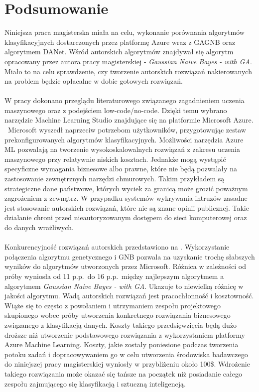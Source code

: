 \chapter{Podsumowanie}
Niniejsza praca magisterska miała na celu, wykonanie porównania algorytmów klasyfikacyjnych dostarczonych przez platformę Azure wraz z GAGNB oraz algorytmem DANet. Wśród autorskich algorytmów znajdywał się algorytm opracowany przez autora pracy magisterskiej - \textit{Gaussian Naive Bayes - with GA}. Miało to na celu sprawdzenie, czy tworzenie autorskich rozwiązań nakierowanych na problem będzie opłacalne w dobie gotowych rozwiązań.
\\ \\
W pracy dokonano przeglądu literaturowego związanego zagadnieniem uczenia maszynowego oraz z podejściem low-code/no-code. Dzięki temu wybrano narzędzie Machine Learning Studio znajdujące się na platformie Microsoft Azure. \ Microsoft wyszedł naprzeciw potrzebom użytkowników, przygotowując zestaw prekonfigurowanych algorytmów klasyfikacyjnych. Możliwości narzędzia Azure ML pozwalają na tworzenie wysokoskalowalnych rozwiązań z zakresu uczenia maszynowego przy relatywnie niskich kosztach. Jednakże mogą wystąpić specyficzne wymagania biznesowe albo prawne, które nie będą pozwalały na zastosowanie zewnętrznych narzędzi chmurowych. Takim przykładem są strategiczne dane państwowe, których wyciek za granicą może grozić poważnym zagrożeniem z zewnątrz. W przypadku systemów wykrywania intruzów zasadne jest stosowanie autorskich rozwiązań, które nie są znane opinii publicznej. Takie działanie chroni przed nieautoryzowanym dostępem do sieci komputerowej oraz do danych wrażliwych.
\\ \\
Konkurencyjność rozwiązań autorskich przedstawiono na . Wykorzystanie połączenia algorytmu genetycznego i GNB pozwala na uzyskanie trochę słabszych wyników do algorytmów utworzonych przez Microsoft. Różnica w zależności od próby wyniosła od 11 p.p.\ do 16 p.p.\ między najlepszym algorytmem a algorytmem \textit{Gaussian Naive Bayes - with GA}. Ukazuje to niewielką różnicę w jakości algorytmu. Wadą autorskich rozwiązań jest pracochłonność i kosztowność. Wiąże się to często z powołaniem i utrzymaniem zespołu projektowego skupionego wobec próby utworzenia konkretnego rozwiązania biznesowego związanego z klasyfikacją danych. Koszty takiego przedsięwzięcia będą dużo droższe niż utworzenie podstawowego rozwiązania z wykorzystaniem platformy Azure Machine Learning. Koszty, jakie zostały poniesione podczas tworzenia potoku zadań i dopracowywaniem go w celu utworzenia środowiska badawczego do niniejszej pracy magisterskiej wyniosły w przybliżeniu około 100\$. Wdrożenie takiego rozwiązania może okazać się tańsze na początek niż posiadanie całego zespołu zajmującego się klasyfikacją i sztuczną inteligencją.
